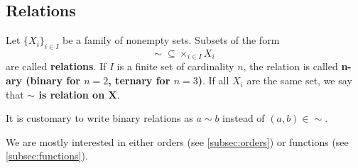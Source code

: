 \subsection{Relations}\label{subsec:relations}

\begin{definition}\label{def:relation}
  Let \( \{ X_i \}_{i \in I} \) be a family of nonempty sets.
  Subsets of the form
  \begin{equation*}
    \sim\; \subseteq \times_{i \in I} X_i
  \end{equation*}
  are called \textbf{relations}. If \( I \) is a finite set of cardinality \( n \), the relation is called \textbf{n-ary (binary for \( n = 2 \), ternary for \( n = 3 \))}. If all \( X_i \) are the same set, we say that \textbf{\( \sim \) is relation on X}.

  It is customary to write binary relations as \( a \sim b \) instead of \( (a, b) \in \sim \).
\end{definition}

\begin{remark}\label{note:main_relation_types}
  We are mostly interested in either orders (see \cref{subsec:orders}) or functions (see \cref{subsec:functions}).
\end{remark}

